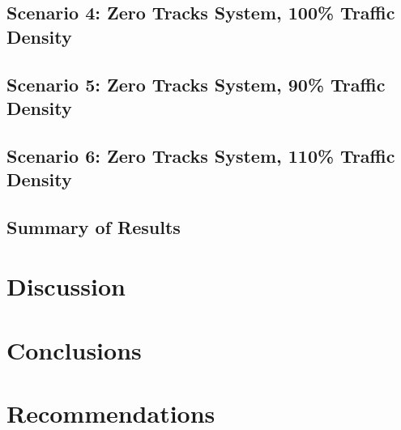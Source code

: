 \documentclass[stu, a4paper, 12pt, floatsintext]{apa7}
\numberwithin{figure}{section}
\numberwithin{table}{section}
\numberwithin{equation}{section}
\begin{document}
\subsection{Scenario 4: Zero Tracks System, 100\% Traffic Density}
\subsection{Scenario 5: Zero Tracks System, 90\% Traffic Density}
\subsection{Scenario 6: Zero Tracks System, 110\% Traffic Density}
\subsection{Summary of Results}
\section{Discussion}
\section{Conclusions}
\section{Recommendations}

\printbibliography
\end{document}
